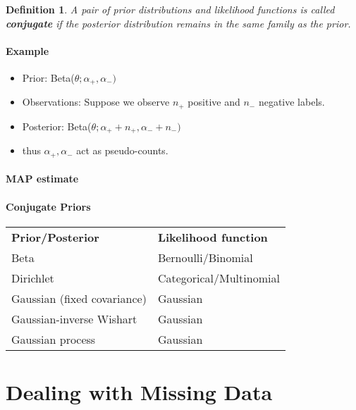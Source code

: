 \documentclass[10pt,a4paper]{scrartcl}
\newtheorem{define}{Definition}
\newcommand{\Argmax}[2]{\text{arg}\underset{#1}{\max}\left(#2\right)}
\begin{document}
\begin{multicols*}{2}
\begin{define}
A pair of prior distributions and likelihood functions is called \textbf{conjugate} if the posterior distribution remains in the same family as the prior.
\end{define}

\paragraph{Example}

\begin{itemize}
\item Prior: Beta($\theta;\alpha_+,\alpha_-)$
\item Observations: Suppose we observe $n_+$ positive and $n_-$ negative labels.
\item Posterior: Beta($\theta;\alpha_++n_+,\alpha_-+n_-)$
\item thus $\alpha_+,\alpha_-$ act as pseudo-counts.
\end{itemize}

\paragraph{MAP estimate}

\mportant{$\hat{\theta}=\Argmax{\theta}{P(\theta|y_1,\ldots,y_n;\alpha_+,\alpha_-)}=\frac{\alpha_++n_+-1}{\alpha_++n_++\alpha_-+n_--2}$}

\paragraph{Conjugate Priors}

\begin{center}
\begin{tabular}{ll}
\textbf{Prior/Posterior}&\textbf{Likelihood function}\\
Beta&Bernoulli/Binomial\\
Dirichlet&Categorical/Multinomial\\
Gaussian (fixed covariance)&Gaussian\\
Gaussian-inverse Wishart&Gaussian\\
Gaussian process&Gaussian
\end{tabular}
\end{center}

\section{Dealing with Missing Data}


\end{multicols*}
\end{document}
